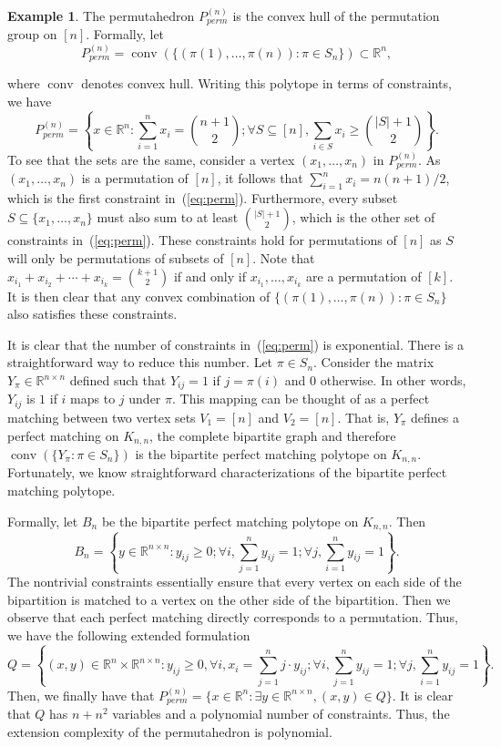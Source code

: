\documentclass{article}
\theoremstyle{definition}
\newtheorem{example}[theorem]{Example}
\theoremstyle{remark}
\newcommand{\abs}[1]{\left|#1\right|}
\newcommand{\conv}{\operatorname{conv}}
\renewcommand{\R}{\mathbb{R}}
\begin{document}
\begin{example}
The permutahedron $P_{perm}^{(n)}$ is the convex hull of the permutation group on $[n]$. Formally, let 
\[
P_{perm}^{(n)} = \conv(\{(\pi(1), \ldots, \pi(n)) : \pi \in S_n\}) \subset \R^n,
\]

where $\conv$ denotes convex hull. Writing this polytope in terms of constraints, we have
\begin{equation}\label{eq:perm}
P_{perm}^{(n)} = \left\{x \in \R^n : \sum_{i=1}^n x_i = \binom{n+1}{2}; \forall S \subseteq [n], \sum_{i\in S} x_i \ge \binom{\abs{S} + 1}{2}\right\}.
\end{equation}
To see that the sets are the same, consider a vertex $(x_1, \ldots, x_n)$ in $P_{perm}^{(n)}$. As $(x_1, \ldots, x_n)$ is a permutation of $[n]$, it follows that $\sum_{i=1}^n x_i = n(n+1)/2$, which is the first constraint in~(\ref{eq:perm}). Furthermore, every subset $S \subseteq \{x_1, \ldots, x_n\}$ must also sum to at least $\binom{\abs{S} + 1}{2}$, which is the other set of constraints in~(\ref{eq:perm}). These constraints hold for permutations of $[n]$ as $S$ will only be permutations of subsets of $[n]$. Note that $x_{i_1} + x_{i_2} + \cdots + x_{i_k} = \binom{k + 1}{2}$ if and only if $x_{i_1}, \ldots, x_{i_k}$ are a permutation of $[k]$. It is then clear that any convex combination of $\{(\pi(1), \ldots, \pi(n)) : \pi \in S_n\}$ also satisfies these constraints.

It is clear that the number of constraints in~(\ref{eq:perm}) is exponential. There is a straightforward way to reduce this number. Let $\pi \in S_n$. Consider the matrix $Y_\pi \in \R^{n \times n}$ defined such that $Y_{ij} = 1$ if $j = \pi(i)$ and $0$ otherwise. In other words, $Y_{ij}$ is $1$ if $i$ maps to $j$ under $\pi$. This mapping can be thought of as a perfect matching between two vertex sets $V_1 = [n]$ and $V_2 = [n]$. That is, $Y_\pi$ defines a perfect matching on $K_{n,n}$, the complete bipartite graph and therefore $\conv(\{Y_\pi : \pi \in S_n\})$ is the bipartite perfect matching polytope on $K_{n,n}$. Fortunately, we know straightforward characterizations of the bipartite perfect matching polytope. 

Formally, let $B_{n}$ be the bipartite perfect matching polytope on $K_{n,n}$. Then 
\[
B_n = \left\{ y \in \R^{n \times n} : y_{ij} \ge 0; \forall i, \sum_{j=1}^n y_{ij} = 1; \forall j, \sum_{i=1}^n y_{ij} = 1\right\}.
\]
The nontrivial constraints essentially ensure that every vertex on each side of the bipartition is matched to a vertex on the other side of the bipartition. Then we observe that each perfect matching directly corresponds to a permutation. Thus, we have the following extended formulation
\[
Q = \left\{(x,y) \in \R^n \times \R^{n \times n} : y_{ij} \ge 0, \forall i, x_i = \sum_{j=1}^n j \cdot y_{ij}; \forall i, \sum_{j=1}^n y_{ij} = 1; \forall j, \sum_{i=1}^n y_{ij} = 1\right\}.
\]
Then, we finally have that $P_{perm}^{(n)} = \{x \in \R^n : \exists y \in \R^{n \times n}, (x,y) \in Q\}$. It is clear that $Q$ has $n + n^2$ variables and a polynomial number of constraints. Thus, the extension complexity of the permutahedron is polynomial. 
\end{example}
\end{document}
